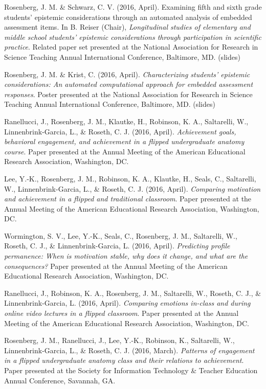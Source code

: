 \documentclass[]{article}
\begin{document}
Rosenberg, J. M. \& Schwarz, C. V. (2016, April). Examining fifth and
sixth grade students' epistemic considerations through an automated
analysis of embedded assessment items. In B. Reiser (Chair),
\emph{Longitudinal studies of elementary and middle school students'
epistemic considerations through participation in scientific practice}.
Related paper set presented at the National Association for Research in
Science Teaching Annual International Conference, Baltimore, MD.
(slides)

Rosenberg, J. M. \& Krist, C. (2016, April). \emph{Characterizing
students' epistemic considerations: An automated computational approach
for embedded assessment responses}. Poster presented at the National
Association for Research in Science Teaching Annual International
Conference, Baltimore, MD. (slides)

Ranellucci, J., Rosenberg, J. M., Klautke, H., Robinson, K. A.,
Saltarelli, W., Linnenbrink-Garcia, L., \& Roseth, C. J. (2016, April).
\emph{Achievement goals, behavioral engagement, and achievement in a
flipped undergraduate anatomy course}. Paper presented at the Annual
Meeting of the American Educational Research Association, Washington,
DC.

Lee, Y.-K., Rosenberg, J. M., Robinson, K. A., Klautke, H., Seals, C.,
Saltarelli, W., Linnenbrink-Garcia, L., \& Roseth, C. J. (2016, April).
\emph{Comparing motivation and achievement in a flipped and traditional
classroom}. Paper presented at the Annual Meeting of the American
Educational Research Association, Washington, DC.

Wormington, S. V., Lee, Y.-K., Seals, C., Rosenberg, J. M., Saltarelli,
W., Roseth, C. J., \& Linnenbrink-Garcia, L. (2016, April).
\emph{Predicting profile permanence: When is motivation stable, why does
it change, and what are the consequences?} Paper presented at the Annual
Meeting of the American Educational Research Association, Washington,
DC.

Ranellucci, J., Robinson, K. A., Rosenberg, J. M., Saltarelli, W.,
Roseth, C. J., \& Linnenbrink-Garcia, L. (2016, April). \emph{Comparing
emotions in-class and during online video lectures in a flipped
classroom}. Paper presented at the Annual Meeting of the American
Educational Research Association, Washington, DC.

Rosenberg, J. M., Ranellucci, J., Lee, Y.-K., Robinson, K., Saltarelli,
W., Linnenbrink-Garcia, L., \& Roseth, C. J. (2016, March).
\emph{Patterns of engagement in a flipped undergraduate anatomy class
and their relations to achievement}. Paper presented at the Society for
Information Technology \& Teacher Education Annual Conference, Savannah,
GA.
\end{document}
